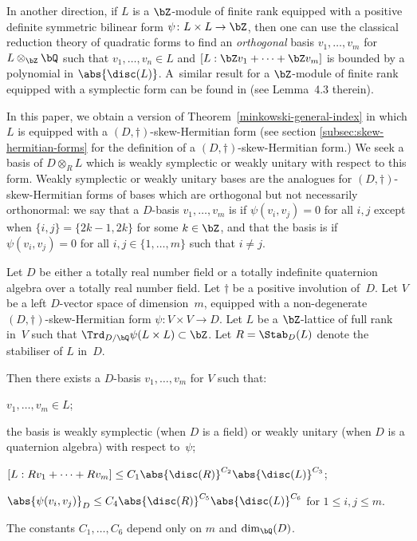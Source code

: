 In another direction, if $L$ is a $\bZ$-module of finite rank equipped with a positive definite symmetric bilinear form $\psi \colon L \times L \to \bZ$, then one can use the classical reduction theory of quadratic forms to find an \textit{orthogonal} basis $v_1, \dotsc, v_m$ for $L \otimes_\bZ \bQ$ such that $v_1, \dotsc, v_n \in L$ and $[L:\bZ v_1 + \dotsb + \bZ v_m]$ is bounded by a polynomial in $\abs{\disc(L)}$.
A~similar result for a $\bZ$-module of finite rank equipped with a symplectic form can be found in \cite{Orr15} (see Lemma~4.3 therein).

In this paper, we obtain a version of Theorem~\ref{minkowski-general-index} in which $L$ is equipped with a $(D,\dag)$-skew-Hermitian form (see section \ref{subsec:skew-hermitian-forms} for the definition of a $(D,\dag)$-skew-Hermitian form.)
We seek a basis of $D \otimes_R L$ which is weakly symplectic or weakly unitary with respect to this form. Weakly symplectic or weakly unitary bases are the analogues for $(D,\dag)$-skew-Hermitian forms of bases which are orthogonal but not necessarily orthonormal: we say that a $D$-basis $v_1, \dotsc, v_m$ is  if $\psi(v_i, v_j) = 0$ for all $i, j$ except when $\{i,j\} = \{2k-1,2k\}$ for some $k \in \bZ$, and that the basis is  if $\psi(v_i, v_j) = 0$ for all $i, j \in \{ 1, \dotsc, m \}$ such that $i \neq j$.

\begin{theorem} \label{minkowski-hermitian-perfect}
Let $D$ be either a totally real number field or a totally indefinite quaternion algebra over a totally real number field.
Let $\dag$ be a positive involution of~$D$.
Let $V$ be a left $D$-vector space of dimension~$m$, equipped with a non-degenerate $(D,\dag)$-skew-Hermitian form $\psi \colon V \times V \to D$.
Let $L$ be a $\bZ$-lattice of full rank in~$V$ such that $\Trd_{D/\bQ} \psi(L \times L) \subset \bZ$.
Let $R=\Stab_D(L)$ denote the stabiliser of $L$ in~$D$.

Then there exists a $D$-basis $v_1, \dotsc, v_m$ for $V$ such that:
\begin{enumeratei}
\item\label{minkowski-hermitian-perfecti} $v_1, \dotsc, v_m \in L$;
\item\label{minkowski-hermitian-perfectii} the basis is weakly symplectic (when $D$ is a field) or weakly unitary (when $D$ is a quaternion algebra) with respect to~$\psi$;
\item\label{minkowski-hermitian-perfectiii} $[L:Rv_1 + \dotsb + Rv_m] \leq C_{1} \abs{\disc(R)}^{C_{2}} \abs{\disc(L)}^{C_{3}}$;
\item\label{minkowski-hermitian-perfectiv} $\abs{\psi(v_i, v_j)}_D \leq C_{4} \abs{\disc(R)}^{C_{5}} \abs{\disc(L)}^{C_{6}}$ for $1 \leq i, j \leq m$.
\end{enumeratei}
The constants $C_{1}, \dotsc, C_{6}$ depend only on $m$ and $\dim_\bQ(D)$.
\end{theorem}

